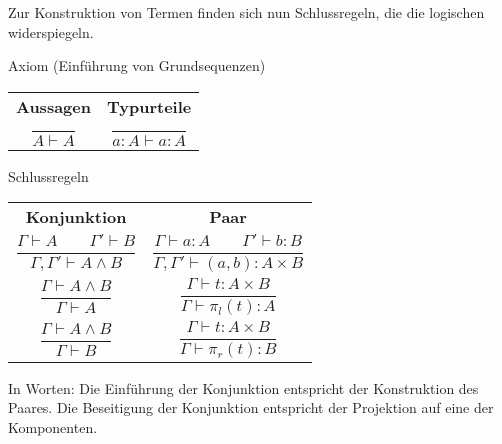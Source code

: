 \documentclass[8pt]{beamer}
\newcommand{\strong}[1]{\textsf{\textbf{#1}}}
\newcommand{\parspace}{\vspace{0.8em}}
\begin{document}
\begin{frame}
Zur Konstruktion von Termen finden sich nun Schlussregeln, die die
logischen widerspiegeln.\pause

\begin{block}{Axiom (Einführung von Grundsequenzen)}
\begin{center}
\begin{tabular}{c@{\qquad\qquad}c}
\strong{Aussagen} & \strong{Typurteile}\\[10pt]
$\dfrac{}{A\vdash A}$ & $\dfrac{}{a\colon A\vdash a\colon A}$
\end{tabular}
\end{center}
\end{block}
\end{frame}

\begin{frame}
\begin{block}{Schlussregeln}
\begin{center}
\begin{tabular}{c@{\qquad\qquad}c}
\strong{Konjunktion}
& \strong{Paar}\\[10pt]
$\dfrac{\Gamma\vdash A\qquad\Gamma'\vdash B}{\Gamma,\Gamma'\vdash A\land B}$
&
$\dfrac{\Gamma\vdash a\colon A\qquad\Gamma'\vdash b\colon B}{\Gamma,\Gamma'\vdash (a,b)\colon A\times B}$\\[18pt]
$\dfrac{\Gamma\vdash A\land B}{\Gamma\vdash A}$
& $\dfrac{\Gamma\vdash t\colon A\times B}{\Gamma\vdash \pi_l(t)\colon A}$\\[18pt]
$\dfrac{\Gamma\vdash A\land B}{\Gamma\vdash B}$
& $\dfrac{\Gamma\vdash t\colon A\times B}{\Gamma\vdash \pi_r(t)\colon B}$
\end{tabular}
\end{center}
\end{block}\pause

\parspace
In Worten: Die Einführung der Konjunktion entspricht der Konstruktion
des Paares. Die Beseitigung der Konjunktion entspricht der Projektion
auf eine der Komponenten.
\end{frame}
\end{document}
